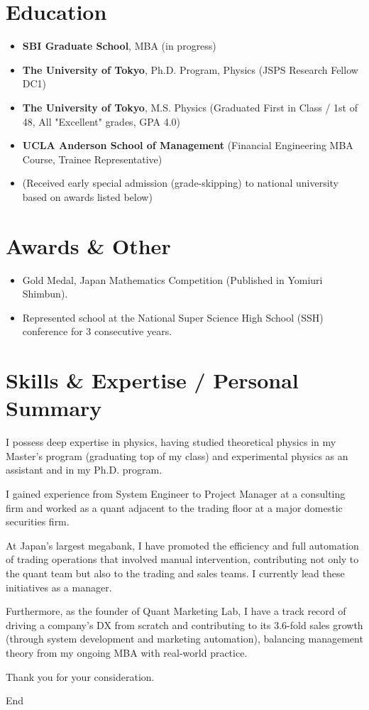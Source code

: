 \documentclass[uplatex,a4j,10.5pt,dvipdfmx]{jsarticle}
\begin{document}
\section*{Education}
\begin{itemize}[leftmargin=*]
	\item \textbf{SBI Graduate School}, MBA (in progress)
	\item \textbf{The University of Tokyo}, Ph.D. Program, Physics (JSPS Research Fellow DC1)
	\item \textbf{The University of Tokyo}, M.S. Physics (Graduated First in Class / 1st of 48, All "Excellent" grades, GPA 4.0)
	\item \textbf{UCLA Anderson School of Management} (Financial Engineering MBA Course, Trainee Representative)
	\item (Received early special admission (grade-skipping) to national university based on awards listed below)
\end{itemize}

\section*{Awards \& Other}
\begin{itemize}[leftmargin=*]
	\item Gold Medal, Japan Mathematics Competition (Published in Yomiuri Shimbun).
	\item Represented school at the National Super Science High School (SSH) conference for 3 consecutive years.
\end{itemize}

\section*{Skills \& Expertise / Personal Summary}

I possess deep expertise in physics, having studied theoretical physics in my Master's program (graduating top of my class) and experimental physics as an assistant and in my Ph.D. program.

I gained experience from System Engineer to Project Manager at a consulting firm and worked as a quant adjacent to the trading floor at a major domestic securities firm.

At Japan's largest megabank, I have promoted the efficiency and full automation of trading operations that involved manual intervention, contributing not only to the quant team but also to the trading and sales teams. I currently lead these initiatives as a manager.

Furthermore, as the founder of Quant Marketing Lab, I have a track record of driving a company's DX from scratch and contributing to its 3.6-fold sales growth (through system development and marketing automation), balancing management theory from my ongoing MBA with real-world practice.

\vspace{1\baselineskip}
Thank you for your consideration.

\vspace{1\baselineskip}
\hfill End
\end{document}
